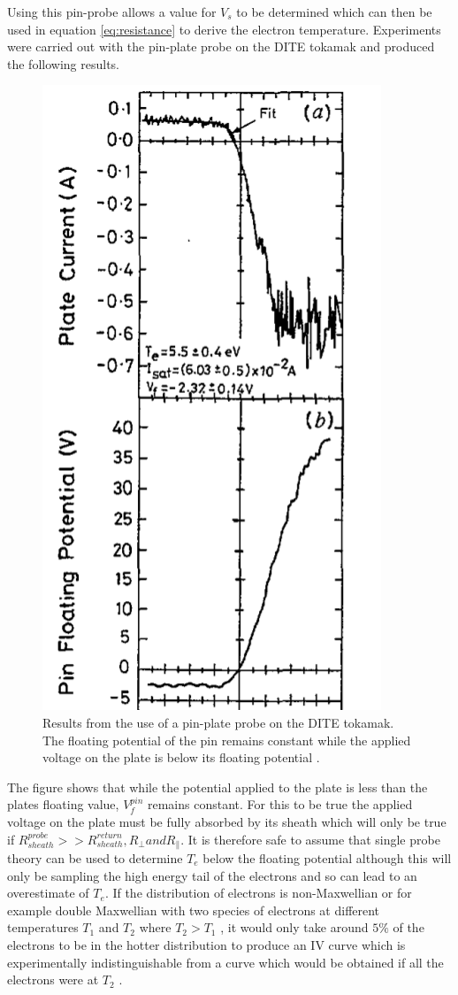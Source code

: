 \documentclass[12pt]{article}
\begin{document}
Using this pin-probe allows a value for $V_s$ to be determined which can then be used in equation \eqref{eq:resistance} to derive the electron temperature. Experiments were carried out with the pin-plate probe on the DITE tokamak and produced the following results. 


\begin{figure}[H]
\centering
\includegraphics[height=0.75\textwidth]{DITE}
\caption{Results from the use of a pin-plate probe on the DITE tokamak. The floating potential of the pin remains constant while the applied voltage on the plate is below its floating potential \cite{te-determination}.}
\end{figure}

The figure shows that while the potential applied to the plate is less than the plates floating value,  $V_{f}^{pin}$ remains constant. For this to be true the applied voltage on the plate must be fully absorbed by its sheath which will only be true if $ R^{probe}_{sheath} >> R^{return}_{sheath}, R_\perp and R_\parallel$. It is therefore safe to assume that single probe theory can be used to determine $T_e$ below the floating potential although this will only be sampling the high energy tail of the electrons and so can lead to an overestimate of $T_e$. If the distribution of electrons is non-Maxwellian or for example double Maxwellian with two species of electrons at different temperatures $T_1$ and $T_2$ where $T_2 > T_1$ , it would only take around $5\%$ of the electrons to be in the hotter distribution to produce an IV curve which is experimentally indistinguishable from a curve which would be obtained if all the electrons were at $T_2$ \cite{T1-T2}. 
\end{document}
